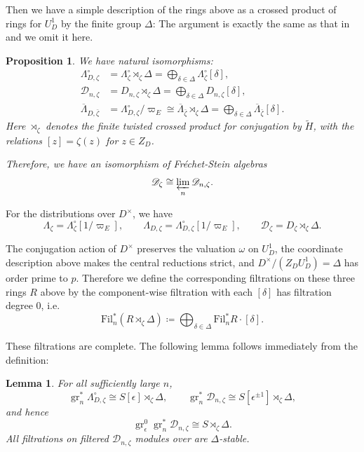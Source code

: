 \documentclass[11pt]{article}
\newtheorem{proposition}[theorem]{Proposition}
\newtheorem{lemma}[theorem]{Lemma}
\theoremstyle{definition}
\newcommand{\gr}{\operatorname{gr}}
\begin{document}
Then we have a simple description of the rings above as a crossed product of rings for $U_D^1$ by the finite group $\Delta$:
The argument is exactly the same as that in \cite{Passman1989} and we omit it here.
\begin{proposition}\label{prop:equivariant-crossed-product-filtration}
      We have natural isomorphisms:
      \begin{align*}
 \Lambda_{D,\zeta}^\circ
 &=\Lambda_\zeta^\circ\rtimes_\zeta\Delta
   =\bigoplus_{\delta\in\Delta}\Lambda_\zeta^\circ[\delta],\\
 \mathscr D_{n,\zeta}
 &=D_{n,\zeta}\rtimes_\zeta\Delta
   =\bigoplus_{\delta\in\Delta}D_{n,\zeta}[\delta],\\
 \overline{\Lambda}_{D,\bar\zeta}
 &=\Lambda_{D,\zeta}^\circ/\varpi_E
   \cong\overline{\Lambda}_{\bar\zeta}\rtimes_{\zeta}\Delta=\bigoplus_{\delta\in\Delta}\overline{\Lambda}_{\bar\zeta}[\delta].
\end{align*}
Here $\rtimes_\zeta$ denotes the finite twisted crossed product for
conjugation by $\widetilde H$, with the relations
$[z]=\zeta(z)$ for $z\in Z_D$.

Therefore, we have an isomorphism of Fr\'echet-Stein algebras
\[\mathscr{D}_\zeta\cong\varprojlim_n\mathscr{D}_{n,\zeta}.\]
\end{proposition}


For the distributions over $D^\times$, we have 
\[
 \Lambda_\zeta=\Lambda_\zeta^\circ[1/\varpi_E],\qquad
 \Lambda_{D,\zeta}=\Lambda_{D,\zeta}^\circ[1/\varpi_E],\qquad
 \mathscr D_\zeta=D_\zeta\rtimes_\zeta\Delta.
\]

The conjugation action of $D^\times$ preserves the valuation $\omega$ on $U_D^1$,
the coordinate description above makes the central reductions strict,
and
\(D^\times/(Z_DU_D^1)=\Delta\)
has order prime to $p$.  Therefore we define the corresponding filtrations on these three rings $R$ above by the component-wise filtration with each $[\delta]$ has filtration degree $0$, i.e.
\[\mathrm{Fil}_{n}^*(R\rtimes_\zeta\Delta)\coloneqq\bigoplus_{\delta\in\Delta}\mathrm{Fil}_n^*R\cdot[\delta].\]

These filtrations are complete. The following lemma follows immediately from the definition:

\begin{lemma}\label{lem:equivariant-module-filtration}
For all sufficiently large \(n\),
\[
 \gr_n^*\Lambda_{D,\zeta}^\circ
 \cong S[\epsilon]\rtimes_\zeta\Delta,
 \qquad
 \gr_n^*\mathscr D_{n,\zeta}
 \cong S[\epsilon^{\pm1}]\rtimes_\zeta\Delta,
\]
and hence
\[
 \gr_\epsilon^0\gr_n^*\mathscr D_{n,\zeta}
 \cong S\rtimes_\zeta\Delta.
\]
All filtrations on filtered \(\mathscr D_{n,\zeta}\) modules over are \(\Delta\)-stable.
\end{lemma}
\end{document}
